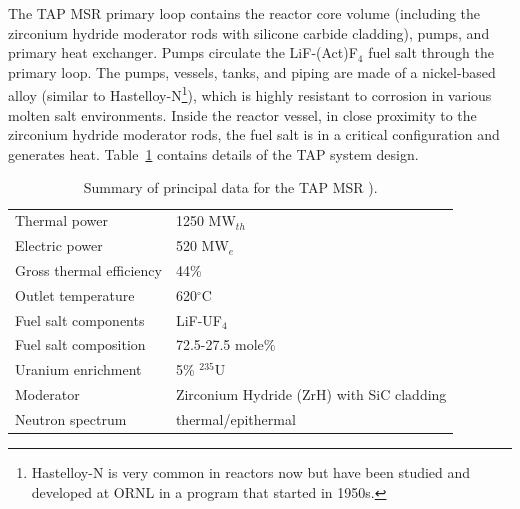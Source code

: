 \documentclass{anstrans}
\begin{document}
The \gls{TAP} \gls{MSR} primary loop contains the reactor core volume 
(including the zirconium hydride moderator rods with silicone carbide 
cladding), pumps, and primary heat exchanger. Pumps circulate the 
LiF-(Act)F$_4$ fuel salt through the primary loop. The pumps, vessels, tanks, 
and piping are made of a nickel-based alloy (similar to Hastelloy-N\footnote{ 
Hastelloy-N  is 	very common in reactors now but have been studied and 
developed at \gls{ORNL} in a program that started in 1950s.}), which is highly 
resistant to corrosion in various molten salt environments. Inside the reactor 
vessel, in close proximity to the zirconium hydride moderator rods, the fuel 
salt is in a critical configuration and generates heat. 
Table~\ref{tab:tap_tab} contains details of the \gls{TAP} system design. 
\begin{table}[h!]
	\caption{Summary of principal data for the \gls{TAP} \gls{MSR} 	
	\cite{transatomic_power_corporation_technical_2016, 
	transatomic_power_corporation_neutronics_2016}). }
	\begin{tabularx}{\linewidth}{X  X }
		\hline
		Thermal power		& 1250 MW$_{th}  $       
		\\ 
		Electric power		& 520 MW$_e  $ 			 
		\\ 
		Gross thermal efficiency 	& 44\%     				 
		\\  
		Outlet temperature			& 620$^{\circ}$C         
		\\ 
		Fuel salt components        & LiF-UF$_4$				 \\  
		Fuel salt composition       & 72.5-27.5 mole\%			 
		\\  
		Uranium enrichment          & 5\% $^{235}$U          	 \\
		Moderator & Zirconium Hydride (ZrH) with SiC 
		cladding \\
		Neutron spectrum						& 
		thermal/epithermal                 \\
		\hline
	\end{tabularx}
	\label{tab:tap_tab}
\end{table}
\end{document}
